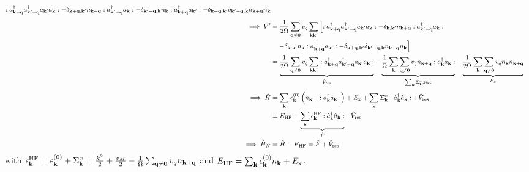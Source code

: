 \begin{align}
:
a_{\mathbf{k}+\mathbf q}^\dagger
a_{\mathbf{k}'-\mathbf q}^\dagger
a_{\mathbf k'}
a_{\mathbf k}
:
-
\delta_{\mathbf{k}+\mathbf q,\mathbf k'}
n_{\mathbf{k}+\mathbf q}
:
a_{\mathbf{k}'-\mathbf q}^\dagger
a_{\mathbf k}
:
-
\delta_{\mathbf{k}'-\mathbf q,\mathbf k}
n_{\mathbf k}
:
a_{\mathbf{k}+\mathbf q}^\dagger
a_{\mathbf k'}
:
-
\delta_{\mathbf{k}+\mathbf q,\mathbf k'}
\delta_{\mathbf{k}'-\mathbf q,\mathbf k}
n_{\mathbf{k}+\mathbf q}n_{\mathbf k}
\\[1ex]
\implies
\hat V'
&=
\frac{1}{2\Omega}
\sum_{\mathbf q\neq\mathbf 0}v_q
\sum_{\mathbf k\mathbf k'}
\left[ 
:
a_{\mathbf{k}+\mathbf q}^\dagger
a_{\mathbf{k}'-\mathbf q}^\dagger
a_{\mathbf k'}
a_{\mathbf k}
: - \delta_{\mathbf{k},\mathbf k'} n_{\mathbf{k}+\mathbf q} : a_{\mathbf{k}'-\mathbf q}^\dagger a_{\mathbf k} : \right. \\
&\quad \left. - \delta_{\mathbf{k},\mathbf k'} n_{\mathbf k} : a_{\mathbf{k}+\mathbf q}^\dagger a_{\mathbf k'} :
- \delta_{\mathbf{k}+\mathbf q,\mathbf k'} \delta_{\mathbf{k'-\mathbf q,\mathbf k}} n_{\mathbf{k}+\mathbf q}n_{\mathbf k}
\right]\\
&=
\underbrace{\frac{1}{2\Omega}
\sum_{\mathbf q\neq\mathbf 0}v_q
\sum_{\mathbf k\mathbf k'}
:
a_{\mathbf{k}+\mathbf q}^\dagger
a_{\mathbf{k}'-\mathbf q}^\dagger
a_{\mathbf k'}
a_{\mathbf k}
: }_{\hat V_{\mathrm{res}}}
-
\underbrace{\frac{1}{\Omega}
\sum_{\mathbf k}
\sum_{\mathbf q\neq\mathbf 0}
v_q n_{\mathbf{k}+\mathbf q}
:
a_{\mathbf k}^\dagger a_{\mathbf k}
:}_{\sum_{\mathbf k}\Sigma_{\mathbf k}^{x} :\hat n_{\mathbf k}:}
-
\underbrace{\frac{1}{2\Omega}
\sum_{\mathbf k}
\sum_{\mathbf q\neq\mathbf 0}
v_q n_{\mathbf k}n_{\mathbf{k}+\mathbf q}}_{E_x}
\\[1ex]
\implies
\hat H
&=
\sum_{\mathbf k}
\epsilon_{\mathbf k}^{(0)}
\left( n_{\mathbf k} + :a_{\mathbf k}^\dagger a_{\mathbf k}:
\right)
+
E_{\rm x}
+
\sum_{\mathbf k}
\Sigma_{\mathbf k}^{x}
:
\hat a_{\mathbf k}^\dagger \hat a_{\mathbf k}
:
+
\hat V_{\mathrm{res}}
\\
&\equiv
E_{\rm HF}
+
\underbrace{\sum_{\mathbf k}
\epsilon_{\mathbf k}^{\rm HF}
:
\hat a_{\mathbf k}^\dagger \hat a_{\mathbf k}
:}_{\hat F}
+
\hat V_{\mathrm{res}}\\
\implies \hat{H}_N
&= \hat H - E_{\rm HF}
=
\hat F +
\hat V_{\mathrm{res}}.
\end{align}
with ${
\epsilon_{\mathbf k}^{\rm HF}
}
=
{
\epsilon_{\mathbf k}^{(0)}
+
\Sigma_{\mathbf k}^{x}
}
=
\frac{k^2}{2}
+
\frac{v_M}{2}
-
\frac{1}{\Omega}
\sum_{\mathbf q\neq\mathbf 0}
v_q n_{\mathbf{k}+\mathbf q}
$ and $E_{\rm HF} = \sum_{\mathbf k}
\epsilon_{\mathbf k}^{(0)}
n_{\mathbf k}
+
E_{\rm x}$.

